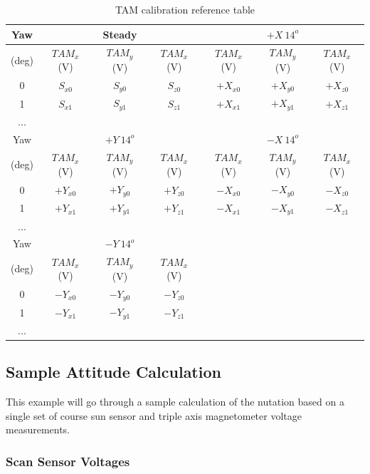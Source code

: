 \begin{table}[H]
  \centering
  \begin{tabular}{c|ccc|ccc}
    \hline
    Yaw   & & Steady & & & $+X \ 14^o$ & \\ \hline
    (deg) & $TAM_x$ (V) & $TAM_y$ (V) & $TAM_x$ (V) & $TAM_x$ (V) & $TAM_y$ (V) & $TAM_x$ (V)  \\ \hline
    0 & $S_{x0}$ & $S_{y0}$ & $S_{z0}$ & $+X_{x0}$ & $+X_{y0}$ & $+X_{z0}$ \\ \hline
    1 & $S_{x1}$ & $S_{y1}$ & $S_{z1}$ & $+X_{x1}$ & $+X_{y1}$ & $+X_{z1}$ \\ \hline
    ... & & & & & &  \\ \hline
    Yaw   & & $+Y \ 14^o$ & & & $-X \ 14^o$ & \\ \hline
    (deg) & $TAM_x$ (V) & $TAM_y$ (V) & $TAM_x$ (V) & $TAM_x$ (V) & $TAM_y$ (V) & $TAM_x$ (V)  \\ \hline
    0 & $+Y_{x0}$ & $+Y_{y0}$ & $+Y_{z0}$ & $-X_{x0}$ & $-X_{y0}$ & $-X_{z0}$ \\ \hline
    1 & $+Y_{x1}$ & $+Y_{y1}$ & $+Y_{z1}$ & $-X_{x1}$ & $-X_{y1}$ & $-X_{z1}$ \\ \hline
    ... & & & & & &  \\ \hline
    Yaw   & & $-Y \ 14^o$ & &  \\ \hline
    (deg) & $TAM_x$ (V) & $TAM_y$ (V) & $TAM_x$ (V)  \\ \hline
    0 & $-Y_{x0}$ & $-Y_{y0}$ & $-Y_{z0}$  \\ \hline
    1 & $-Y_{x1}$ & $-Y_{y1}$ & $-Y_{z1}$  \\ \hline
    ... & & & & & &  \\ \hline
  \end{tabular}
  \caption{TAM calibration reference table}
  \label{tbl:TAMCalibration}
\end{table}

\subsection{Sample Attitude Calculation}
\label{subsec:SampleAttitudeCalculation}

This example will go through a sample calculation of the nutation based on a single set of course sun sensor and triple axis magnetometer voltage measurements.

\subsubsection{Scan Sensor Voltages}

